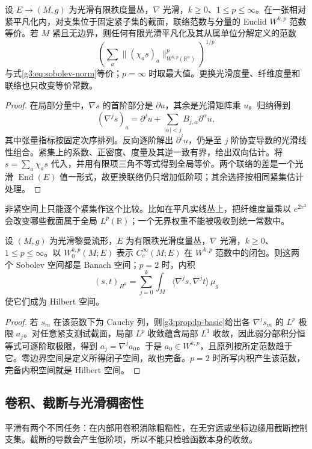 \begin{proposition}\label{g3:prop:sobolev-norm-equivalence}
	设 \(E\to(M,g)\) 为光滑有限秩度量丛，\(\nabla\) 光滑，\(k\ge0\)、\(1\le p\le\infty\)。在一张相对紧平凡化内，对支集位于固定紧子集的截面，联络范数与分量的 Euclid \(W^{k,p}\) 范数等价。若 \(M\) 紧且无边界，则任何有限光滑平凡化及其从属单位分解定义的范数
	\[
		\left(\sum_a\|(\chi_as)_a\|_{W^{k,p}(\mathbb R^n)}^p\right)^{1/p}
	\]
	与式\eqref{g3:eq:sobolev-norm}等价；\(p=\infty\) 时取最大值。更换光滑度量、纤维度量和联络也只改变等价常数。
\end{proposition}
\begin{proof}
	在局部分量中，\(\nabla s\) 的首阶部分是 \(\partial u\)，其余是光滑矩阵乘 \(u\)。归纳得到
	\[
		(\nabla^j s)_a=\partial^j u+\sum_{|\alpha|<j}B_{j,\alpha}\partial^\alpha u,
	\]
	其中张量指标按固定次序排列。反向逐阶解出 \(\partial^j u\)，仍是至 \(j\) 阶协变导数的光滑线性组合。紧集上的系数、正密度、度量及其逆一致有界，给出双向估计。将 \(s=\sum_a\chi_as\) 代入，并用有限项三角不等式得到全局等价。两个联络的差是一个光滑 \(\operatorname{End}(E)\) 值一形式，故更换联络仍只增加低阶项；其余选择按相同紧集估计处理。
\end{proof}

非紧空间上只能逐个紧集作这个比较。比如在平凡实线丛上，把纤维度量乘以 \(e^{2x^2}\) 会改变哪些截面属于全局 \(L^p(\mathbb R)\)；一个无界权重不能被吸收到统一常数中。

\begin{theorem}\label{g3:thm:sobolev-completeness}
	设 \((M,g)\) 为光滑黎曼流形，\(E\) 为有限秩光滑度量丛，\(\nabla\) 光滑，\(k\ge0\)、\(1\le p\le\infty\)。以 \(W^{k,p}_0(M;E)\) 表示 \(C_c^\infty(M;E)\) 在 \(W^{k,p}\) 范数中的闭包。则这两个 Sobolev 空间都是 Banach 空间；\(p=2\) 时，内积
	\[
		(s,t)_{H^k}=\sum_{j=0}^k\int_M\langle\nabla^js,\nabla^jt\rangle\,\mu_g
	\]
	使它们成为 Hilbert 空间。
\end{theorem}
\begin{proof}
	若 \(s_m\) 在该范数下为 Cauchy 列，则\cref{g3:prop:lp-basic}给出各 \(\nabla^j s_m\) 的 \(L^p\) 极限 \(a_j\)。对任意紧支测试截面，局部 \(L^p\) 收敛蕴含局部 \(L^1\) 收敛，因此弱分部积分恒等式可逐阶取极限，得到 \(a_j=\nabla^j a_0\)。于是 \(a_0\in W^{k,p}\)，且原列按所定范数趋于它。零边界空间是定义所得闭子空间，故也完备。\(p=2\) 时所写内积产生该范数，完备内积空间就是 Hilbert 空间。
\end{proof}

\subsection{卷积、截断与光滑稠密性}
\label{g3:subsec:1102:02}
平滑有两个不同任务：在内部用卷积消除粗糙性，在无穷远或坐标边缘用截断控制支集。截断的导数会产生低阶项，所以不能只检验函数本身的收敛。

